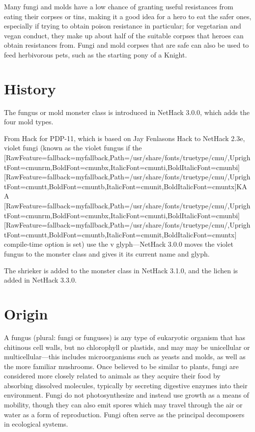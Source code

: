 Many fungi and molds have a low chance of granting useful resistances from eating their corpses or tins, making it a good idea for a hero to eat the safer ones, especially if trying to obtain poison resistance in particular; for vegetarian and vegan conduct, they make up about half of the suitable corpses that heroes can obtain resistances from. Fungi and mold corpses that are safe can also be used to feed herbivorous pets, such as the starting pony of a Knight.

\section{History}
The fungus or mold monster class is introduced in NetHack 3.0.0, which adds the four mold types.

From Hack for PDP-{}11, which is based on Jay Fenlason\textquotesingle{}s Hack\footnotemark[58] to NetHack 2.3e\footnotemark[59], violet fungi (known as the violet fungus if the {\ttfamily \allowbreak{}\setmainfont{cmuntt.ttf}[RawFeature={fallback=myfallback},Path=/usr/share/fonts/truetype/cmu/,UprightFont=cmunrm,BoldFont=cmunbx,ItalicFont=cmunti,BoldItalicFont=cmunbi]\setmonofont{cmuntt.ttf}[RawFeature={fallback=myfallback},Path=/usr/share/fonts/truetype/cmu/,UprightFont=cmuntt,BoldFont=cmuntb,ItalicFont=cmunit,BoldItalicFont=cmuntx]\ttfamily KAA}{$\text{ }$}\allowbreak{}\setmainfont{cmunrm.ttf}[RawFeature={fallback=myfallback},Path=/usr/share/fonts/truetype/cmu/,UprightFont=cmunrm,BoldFont=cmunbx,ItalicFont=cmunti,BoldItalicFont=cmunbi]\setmonofont{cmunrm.ttf}[RawFeature={fallback=myfallback},Path=/usr/share/fonts/truetype/cmu/,UprightFont=cmuntt,BoldFont=cmuntb,ItalicFont=cmunit,BoldItalicFont=cmuntx] compile-{}time option is set) use the v glyph{\mbox{$\text{---}$}}NetHack 3.0.0 moves the violet fungus to the monster class and gives it its current name and glyph.


The shrieker is added to the monster class in NetHack 3.1.0\footnotemark[60], and the lichen is added in NetHack 3.3.0\footnotemark[61].

\section{Origin}
A fungus (plural: fungi or funguses) is any type of eukaryotic organism that has chitinous cell walls, but no chlorophyll or plastids, and may may be unicellular or multicellular{\mbox{$\text{---}$}}this includes microorganisms such as yeasts and molds, as well as the more familiar mushrooms. Once believed to be similar to plants, fungi are considered more closely related to animals as they acquire their food by absorbing dissolved molecules, typically by secreting digestive enzymes into their environment. Fungi do not photosynthesize and instead use growth as a means of mobility, though they can also emit spores which may travel through the air or water as a form of reproduction. Fungi often serve as the principal decomposers in ecological systems.

